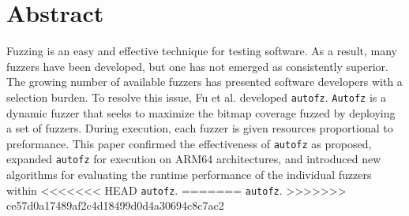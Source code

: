 \section{Abstract}
Fuzzing is an easy and effective technique for testing software. As a result, 
many fuzzers have been developed, but one has not emerged as consistently superior. 
The growing number of available fuzzers has presented software developers with a 
selection burden. To resolve this issue, Fu et al. developed \texttt{autofz}.  
\texttt{Autofz} is a dynamic fuzzer that seeks to maximize the bitmap coverage fuzzed
by deploying a set of fuzzers. During execution, each fuzzer is given resources 
proportional to preformance. \cite{fu_autofz_2023} This paper confirmed the effectiveness of \texttt{autofz} 
as proposed, expanded \texttt{autofz} for execution on ARM64 architectures, and introduced new
algorithms for evaluating the runtime performance of the individual fuzzers within 
<<<<<<< HEAD
\texttt{autofz}.
=======
\texttt{autofz}. 
>>>>>>> ce57d0a17489af2c4d18499d0d4a30694c8c7ac2
